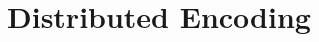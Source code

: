\documentclass[mathserif]{beamer}
\newcommand{\sgn}{\mathsf{sign}}
\newcommand{\unif}{\mathsf{unif}}
\newcommand{\Prob}{\mathbb{P}}
\begin{document}


\section{Distributed Encoding}
\end{document}
